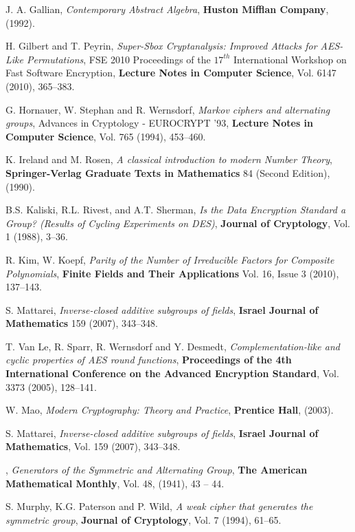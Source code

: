 \documentclass[11pt]{amsart}
\begin{document}
\begin{thebibliography}{9}
 {J. A. Gallian}, \emph {Contemporary {A}bstract {A}lgebra}, {\bf Huston {M}ifflan {C}ompany}, (1992).

 H. Gilbert and T. Peyrin, \emph {Super-Sbox Cryptanalysis: Improved Attacks for AES-Like Permutations},  FSE 2010 Proceedings of the $17^{th}$ International Workshop on Fast Software Encryption, {\bf Lecture Notes in Computer Science}, Vol. 6147 (2010),  365--383.

 G. Hornauer, W. Stephan and R. Wernsdorf, \emph {Markov ciphers and alternating groups}, Advances in Cryptology - EUROCRYPT '93, {\bf Lecture Notes in Computer Science}, Vol. 765 (1994), 453--460.

 K. Ireland and M. Rosen, \emph {A classical introduction to modern Number Theory}, {\bf Springer-Verlag Graduate Texts in Mathematics} 84 (Second Edition), (1990).

 B.S. Kaliski, R.L. Rivest, and A.T. Sherman, \emph {Is the Data Encryption Standard a Group? (Results of Cycling Experiments on DES)}, {\bf Journal of Cryptology}, Vol. 1 (1988), 3--36.

 R. Kim, W. Koepf, \emph{Parity of the Number of Irreducible Factors for Composite Polynomials}, {\bf Finite Fields and Their Applications} Vol. 16, Issue 3 (2010), 137--143. 

 S. Mattarei, \emph {Inverse-closed additive subgroups of fields}, {\bf Israel Journal of  Mathematics} 159 (2007), 343--348.

 T. Van Le, R. Sparr, R. Wernsdorf and Y. Desmedt,  \emph {Complementation-like and cyclic properties of AES round functions}, {\bf Proceedings of the 4th International Conference on the Advanced Encryption Standard}, Vol. 3373 (2005), 128--141.

 W. Mao, \emph {Modern Cryptography: Theory and Practice}, {\bf Prentice Hall}, (2003).

 S. Mattarei, \emph {Inverse-closed additive subgroups of fields}, {\bf Israel Journal of  Mathematics},  Vol. 159 (2007), 343--348.

, \emph {Generators of the Symmetric and Alternating Group}, {\bf The American Mathematical Monthly}, Vol. 48, (1941), 43 -- 44.

 S. Murphy, K.G. Paterson and P. Wild, \emph {A weak cipher that generates the symmetric group}, {\bf Journal of Cryptology}, Vol.  7 (1994), 61--65.


\end{thebibliography}
\end{document}
